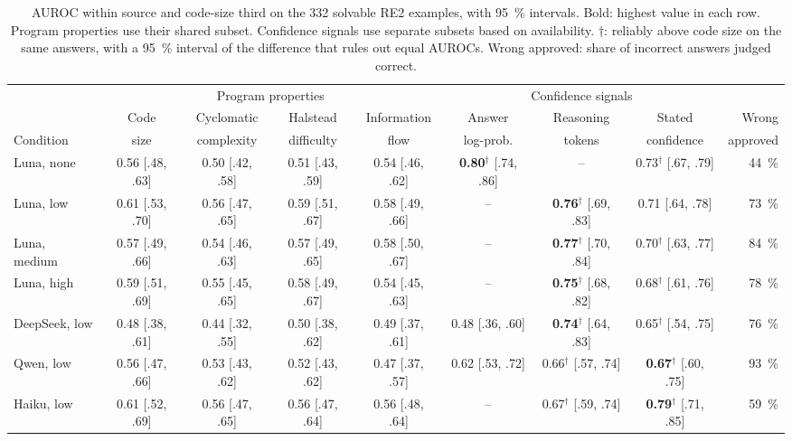 \begin{table}[t]
\centering
\small
\caption{AUROC within source and code-size third on the 332 solvable RE2 examples, with \qty{95}{\percent} intervals. Bold: highest value in each row. Program properties use their shared subset. Confidence signals use separate subsets based on availability. $\dagger$: reliably above code size on the same answers, with a \qty{95}{\percent} interval of the difference that rules out equal AUROCs. Wrong approved: share of incorrect answers judged correct.}
\label{tab:within}
\begin{tabular}{@{}lcccccccr@{}}
\toprule
 & \multicolumn{4}{c}{Program properties} & \multicolumn{3}{c}{Confidence signals} & \\
\cmidrule(lr){2-5} \cmidrule(lr){6-8}
 & Code & Cyclomatic & Halstead & Information & Answer & Reasoning & Stated & Wrong \\
Condition & size & complexity & difficulty & flow & log-prob. & tokens & confidence & approved \\
\midrule
Luna, none & 0.56 [.48, .63] & 0.50 [.42, .58] & 0.51 [.43, .59] & 0.54 [.46, .62] & \textbf{0.80$^\dagger$} [.74, .86] & -- & 0.73$^\dagger$ [.67, .79] & \qty{44}{\percent} \\
Luna, low & 0.61 [.53, .70] & 0.56 [.47, .65] & 0.59 [.51, .67] & 0.58 [.49, .66] & -- & \textbf{0.76$^\dagger$} [.69, .83] & 0.71 [.64, .78] & \qty{73}{\percent} \\
Luna, medium & 0.57 [.49, .66] & 0.54 [.46, .63] & 0.57 [.49, .65] & 0.58 [.50, .67] & -- & \textbf{0.77$^\dagger$} [.70, .84] & 0.70$^\dagger$ [.63, .77] & \qty{84}{\percent} \\
Luna, high & 0.59 [.51, .69] & 0.55 [.45, .65] & 0.58 [.49, .67] & 0.54 [.45, .63] & -- & \textbf{0.75$^\dagger$} [.68, .82] & 0.68$^\dagger$ [.61, .76] & \qty{78}{\percent} \\
DeepSeek, low & 0.48 [.38, .61] & 0.44 [.32, .55] & 0.50 [.38, .62] & 0.49 [.37, .61] & 0.48 [.36, .60] & \textbf{0.74$^\dagger$} [.64, .83] & 0.65$^\dagger$ [.54, .75] & \qty{76}{\percent} \\
Qwen, low & 0.56 [.47, .66] & 0.53 [.43, .62] & 0.52 [.43, .62] & 0.47 [.37, .57] & 0.62 [.53, .72] & 0.66$^\dagger$ [.57, .74] & \textbf{0.67$^\dagger$} [.60, .75] & \qty{93}{\percent} \\
Haiku, low & 0.61 [.52, .69] & 0.56 [.47, .65] & 0.56 [.47, .64] & 0.56 [.48, .64] & -- & 0.67$^\dagger$ [.59, .74] & \textbf{0.79$^\dagger$} [.71, .85] & \qty{59}{\percent} \\
\bottomrule
\end{tabular}
\end{table}
